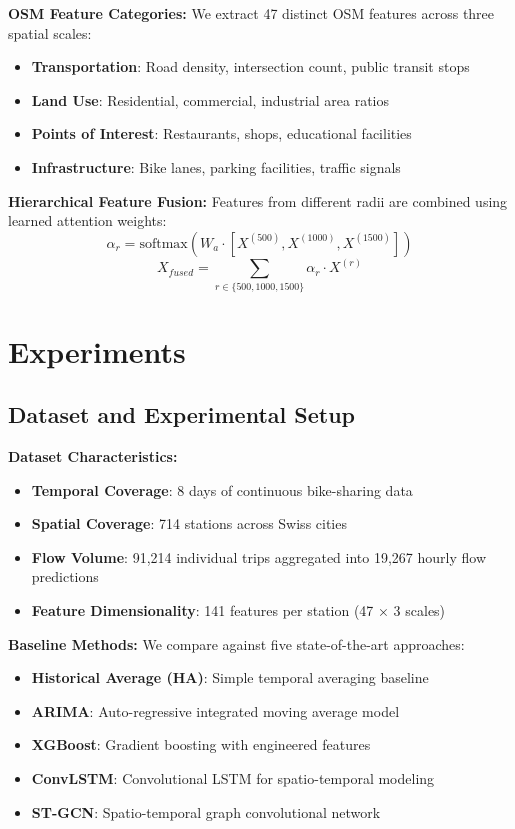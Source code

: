 \documentclass[twocolumn,11pt]{IEEEtran}
\begin{document}
\textbf{OSM Feature Categories:}
We extract 47 distinct OSM features across three spatial scales:
\begin{itemize}
\item \textbf{Transportation}: Road density, intersection count, public transit stops
\item \textbf{Land Use}: Residential, commercial, industrial area ratios
\item \textbf{Points of Interest}: Restaurants, shops, educational facilities
\item \textbf{Infrastructure}: Bike lanes, parking facilities, traffic signals
\end{itemize}

\textbf{Hierarchical Feature Fusion:}
Features from different radii are combined using learned attention weights:
\begin{equation}
\alpha_r = \text{softmax}(W_a \cdot [X^{(500)}, X^{(1000)}, X^{(1500)}])
\end{equation}
\begin{equation}
X_{fused} = \sum_{r \in \{500, 1000, 1500\}} \alpha_r \cdot X^{(r)}
\end{equation}

\section{Experiments}

\subsection{Dataset and Experimental Setup}

\textbf{Dataset Characteristics:}
\begin{itemize}
\item \textbf{Temporal Coverage}: 8 days of continuous bike-sharing data
\item \textbf{Spatial Coverage}: 714 stations across Swiss cities
\item \textbf{Flow Volume}: 91,214 individual trips aggregated into 19,267 hourly flow predictions
\item \textbf{Feature Dimensionality}: 141 features per station (47 × 3 scales)
\end{itemize}

\textbf{Baseline Methods:}
We compare against five state-of-the-art approaches:
\begin{itemize}
\item \textbf{Historical Average (HA)}: Simple temporal averaging baseline
\item \textbf{ARIMA}: Auto-regressive integrated moving average model
\item \textbf{XGBoost}: Gradient boosting with engineered features \cite{chen2016}
\item \textbf{ConvLSTM}: Convolutional LSTM for spatio-temporal modeling \cite{xingjian2015}
\item \textbf{ST-GCN}: Spatio-temporal graph convolutional network \cite{yu2018}
\end{itemize}
\end{document}

